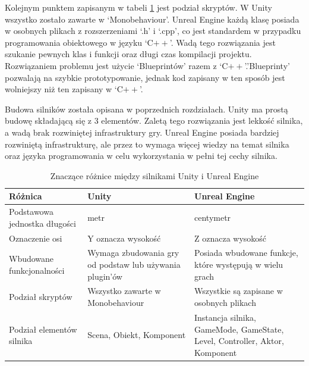 \documentclass[12pt,twoside]{article}
\begin{document}
Kolejnym punktem zapisanym w tabeli \ref{Tabela:RozniceMiedzySIlnikami} jest
podział skryptów. W Unity wszystko zostało zawarte w ‘Monobehaviour’. Unreal
Engine każdą klasę posiada\\w osobnych plikach z rozszerzeniami ‘.h’ i ‘.cpp’, co
jest standardem w przypadku programowania obiektowego w języku ‘C$++$’. Wadą
tego rozwiązania jest szukanie pewnych klas i funkcji oraz długi czas kompilacji
projektu. Rozwiązaniem problemu jest użycie ‘Blueprintów’ razem z
‘C$++$’.’Blueprinty’ pozwalają na szybkie prototypowanie, jednak kod zapisany w
ten sposób jest wolniejszy niż ten zapisany w ‘C$++$’.


Budowa silników została opisana w poprzednich rozdziałach. Unity ma prostą
budowę składającą się z 3 elementów. Zaletą tego rozwiązania jest lekkość
silnika,\\a wadą brak rozwiniętej infrastruktury gry. Unreal Engine posiada
bardziej rozwiniętą infrastrukturę, ale przez to wymaga więcej wiedzy na temat
silnika oraz języka programowania w celu wykorzystania w pełni tej cechy
silnika.

 



\begin{table}[ht]
\caption{Znaczące różnice między silnikami Unity i Unreal Engine}
\centering		
	\begin{tabular}{|p{3cm}|p{}|p{}|}	
		\hline
		Różnica & Unity & Unreal Engine  \\
		\hline
		Podstawowa jednostka długości & metr & centymetr \\
		\hline
		Oznaczenie osi & Y oznacza wysokość & Z oznacza wysokość \\
		\hline
		Wbudowane funkcjonalności & Wymaga zbudowania gry od podstaw lub
		używania plugin’ów & Posiada wbudowane funkcje, które występują w wielu
		grach \\
		\hline
        Podział skryptów & Wszystko zawarte w Monobehaviour & Wszystkie
        są zapisane w osobnych plikach \\
        \hline
        Podział elementów silnika & Scena, Obiekt, Komponent & Instancja
        silnika, GameMode, GameState, Level, Controller, Aktor, Komponent \\
        \hline
	\end{tabular}	
	
\label{Tabela:RozniceMiedzySIlnikami}
\end{table}	
\end{document}

